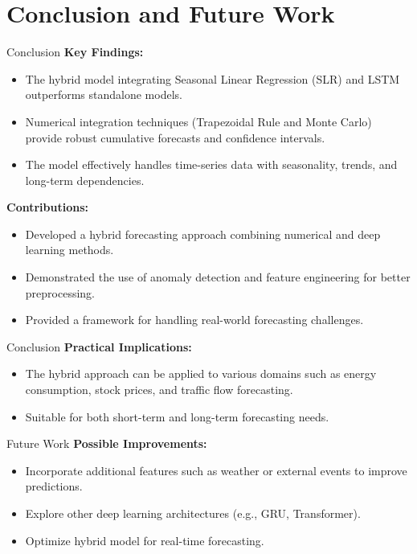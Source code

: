 \documentclass[10pt]{beamer}
\begin{document}
\section{Conclusion and Future Work}
\begin{frame}{Conclusion}
    \textbf{Key Findings:}
    \begin{itemize}
        \item The hybrid model integrating Seasonal Linear Regression (SLR) and LSTM outperforms standalone models.
        \item Numerical integration techniques (Trapezoidal Rule and Monte Carlo) provide robust cumulative forecasts and confidence intervals.
        \item The model effectively handles time-series data with seasonality, trends, and long-term dependencies.
    \end{itemize}

    \singlespacing

    \textbf{Contributions:}
    \begin{itemize}
        \item Developed a hybrid forecasting approach combining numerical and deep learning methods.
        \item Demonstrated the use of anomaly detection and feature engineering for better preprocessing.
        \item Provided a framework for handling real-world forecasting challenges.
    \end{itemize}
\end{frame}

\begin{frame}{Conclusion}
    \textbf{Practical Implications:}
    \begin{itemize}
        \item The hybrid approach can be applied to various domains such as energy consumption, stock prices, and traffic flow forecasting.
        \item Suitable for both short-term and long-term forecasting needs.
    \end{itemize}
\end{frame}

\begin{frame}{Future Work}
    \textbf{Possible Improvements:}
    \begin{itemize}
        \item Incorporate additional features such as weather or external events to improve predictions.
        \item Explore other deep learning architectures (e.g., GRU, Transformer).
        \item Optimize hybrid model for real-time forecasting.
    \end{itemize}
\end{frame}
\end{document}
